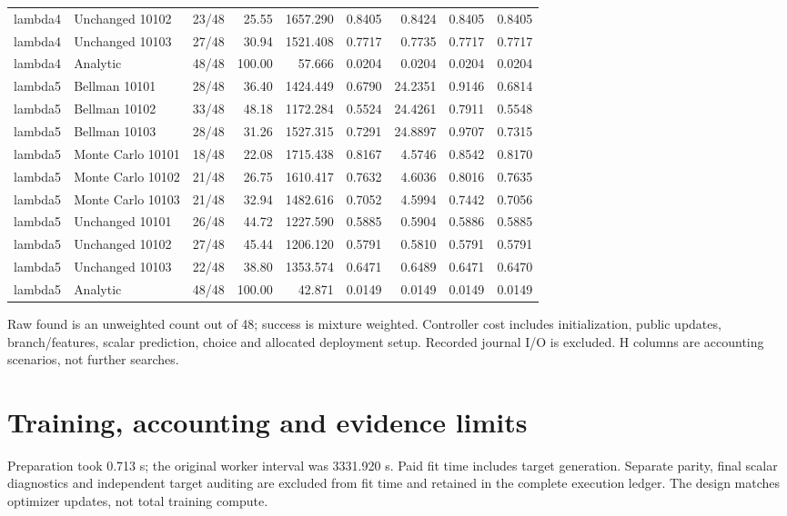 \documentclass[10pt]{article}
\begin{document}
\begin{landscape}
{\begin{tabular}{llrrrrrrr}
lambda4 & Unchanged 10102 & 23/48 & 25.55 & 1657.290 & 0.8405 & 0.8424 & 0.8405 & 0.8405 \\
lambda4 & Unchanged 10103 & 27/48 & 30.94 & 1521.408 & 0.7717 & 0.7735 & 0.7717 & 0.7717 \\
lambda4 & Analytic & 48/48 & 100.00 & 57.666 & 0.0204 & 0.0204 & 0.0204 & 0.0204 \\
lambda5 & Bellman 10101 & 28/48 & 36.40 & 1424.449 & 0.6790 & 24.2351 & 0.9146 & 0.6814 \\
lambda5 & Bellman 10102 & 33/48 & 48.18 & 1172.284 & 0.5524 & 24.4261 & 0.7911 & 0.5548 \\
lambda5 & Bellman 10103 & 28/48 & 31.26 & 1527.315 & 0.7291 & 24.8897 & 0.9707 & 0.7315 \\
lambda5 & Monte Carlo 10101 & 18/48 & 22.08 & 1715.438 & 0.8167 & 4.5746 & 0.8542 & 0.8170 \\
lambda5 & Monte Carlo 10102 & 21/48 & 26.75 & 1610.417 & 0.7632 & 4.6036 & 0.8016 & 0.7635 \\
lambda5 & Monte Carlo 10103 & 21/48 & 32.94 & 1482.616 & 0.7052 & 4.5994 & 0.7442 & 0.7056 \\
lambda5 & Unchanged 10101 & 26/48 & 44.72 & 1227.590 & 0.5885 & 0.5904 & 0.5886 & 0.5885 \\
lambda5 & Unchanged 10102 & 27/48 & 45.44 & 1206.120 & 0.5791 & 0.5810 & 0.5791 & 0.5791 \\
lambda5 & Unchanged 10103 & 22/48 & 38.80 & 1353.574 & 0.6471 & 0.6489 & 0.6471 & 0.6470 \\
lambda5 & Analytic & 48/48 & 100.00 & 42.871 & 0.0149 & 0.0149 & 0.0149 & 0.0149 \\
\bottomrule
\end{tabular}
\par}
Raw found is an unweighted count out of 48; success is mixture weighted. Controller cost includes initialization, public updates, branch/features, scalar prediction, choice and allocated deployment setup. Recorded journal I/O is excluded. H columns are accounting scenarios, not further searches.
\end{landscape}\section{Training, accounting and evidence limits}
Preparation took 0.713 s; the original worker interval was 3331.920 s. Paid fit time includes target generation. Separate parity, final scalar diagnostics and independent target auditing are excluded from fit time and retained in the complete execution ledger. The design matches optimizer updates, not total training compute.
\end{document}
